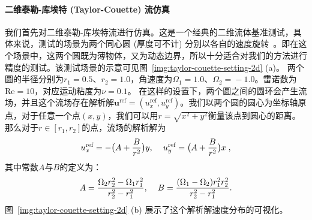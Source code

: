 \paragraph{二维泰勒-库埃特 (Taylor-Couette) 流仿真}
我们首先对二维泰勒-库埃特流进行仿真。这是一个经典的二维流体基准测试，具体来说，测试的场景为两个同心圆 (厚度可不计) 分别以各自的速度旋转~\cite{xu2006immersed}。即在这个场景中，这两个圆既为薄物体，又为动态边界，所以十分适合对我们的方法进行精度的测试。该测试场景的示意可见图~\ref{img:taylor-couette-setting-2d} (a)。
两个圆的半径分别为$r_1 \!=\! 0.5$、$r_2 \!=\! 1.0$，角速度为$\Omega_1 \!=\! 1.0$、$\Omega_2 \!=\! -1.0$。雷诺数为$\text{Re} \!=\! 10$，对应运动粘度为$\nu \!=\! 0.1$。
在这样的设置下，两个圆之间的圆环会产生流场，并且这个流场存在解析解$\bm{u}^\text{ref}\!=\!(u_x^\text{ref},u_y^\text{ref})$。我们以两个圆的圆心为坐标轴原点，对于任意一个点$(x,y)$，我们可以用$r\!=\!\sqrt{x^2+y^2}$衡量该点到圆心的距离。那么对于$r\!\in\![r_1, r_2]$的点，流场的解析解为
\begin{equation}
u_x^\text{ref} = -\bigl(A + \frac{B}{r^2}\bigr)y, \hspace{4mm} u_y^\text{ref} = \bigl(A + \frac{B}{r^2}\bigr)x\;,
\end{equation}
\noindent 其中常数$A$与$B$的定义为：
\begin{equation}
A = \frac{\Omega_2 r_2^2 - \Omega_1 r_1^2}{r_2^2 - r_1^2}, \hspace{4mm} B= \frac{(\Omega_1 - \Omega_2)r_1^2r_2^2}{r_2^2 - r_1^2}.
\end{equation}
图~\ref{img:taylor-couette-setting-2d} (b) 展示了这个解析解速度分布的可视化。

